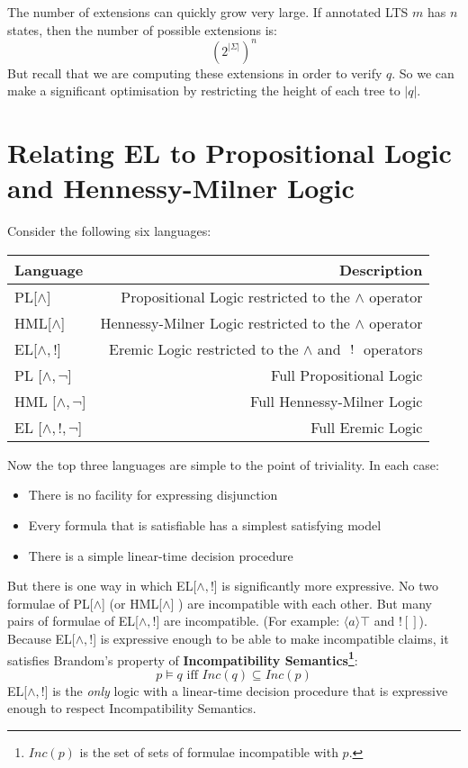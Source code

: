 The number of extensions can quickly grow very large.
If annotated LTS $m$ has $n$ states, then the number of possible extensions is:
\[
({2^{|\Sigma|}})^n
\] 
But recall that we are computing these extensions in order to verify $q$. So we can make a significant optimisation by restricting the height of each tree to $|q|$.

\section{Relating EL to Propositional Logic and Hennessy-Milner Logic}
Consider the following six languages:
\begin{center}
\begin{tabular}{ l | r }
Language & Description \\
\hline
PL[$\land$] & Propositional Logic restricted to the $\land$ operator \\
HML[$\land$] & Hennessy-Milner Logic restricted to the $\land$ operator \\
EL[$\land, !$] & Eremic Logic restricted to the $\land$ and $\ ! \ $ operators \\
PL [$\land, \neg$] & Full Propositional Logic \\
HML [$\land, \neg$] & Full Hennessy-Milner Logic \\
EL [$\land, !, \neg$] & Full Eremic Logic \\
\end{tabular}
\end{center}
Now the top three languages are simple to the point of triviality. In each case:
\begin{itemize}
\item
There is no facility for expressing disjunction
\item
Every formula that is satisfiable has a simplest satisfying model
\item
There is a simple linear-time decision procedure
\end{itemize}
But there is one way in which EL[$\land, !$]  is significantly more expressive.
No two formulae of PL[$\land$] (or HML[$\land$] ) are incompatible with each other. 
But many pairs of formulae of EL[$\land, !$] are incompatible.
(For example: $\langle a \rangle \top$ and $! []$). 
Because EL[$\land, !$]  is expressive enough to be able to make incompatible claims, it satisfies Brandom's property of {\bf Incompatibility Semantics\footnote{$Inc(p)$ is the set of sets of formulae incompatible with $p$.}}:
\[
p \models q \mbox{ iff } Inc(q) \subseteq Inc(p)
\]
EL[$\land, !$]  is the \emph{only} logic with a linear-time decision procedure that is expressive enough to respect Incompatibility Semantics.

